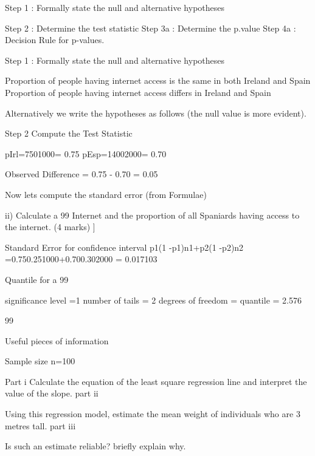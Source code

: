 \documentclass[12pt]{report}
\begin{document}
Step 1 : Formally state the null and alternative hypotheses

Step 2 : Determine the test statistic
Step 3a : Determine the p.value
Step 4a : Decision Rule for p-values.



Step 1 : Formally state the null and alternative hypotheses

Proportion of people having internet access is the same in both Ireland and Spain
Proportion of people having internet access differs in Ireland and Spain


Alternatively we write the hypotheses as follows (the null value is more evident).





Step 2 Compute the Test Statistic

pIrl=7501000= 0.75 
pEsp=14002000= 0.70

Observed Difference = 0.75 - 0.70 = 0.05  

Now lets compute the standard error (from Formulae)


ii)      Calculate a 99%
Internet and the proportion of all Spaniards having access to the internet.  (4 marks)
]

Standard Error for confidence interval	p1(1 -p1)n1+p2(1 -p2)n2	=0.750.251000+0.700.302000     =  0.017103



Quantile for a 99%

significance level  =1%
number of tails = 2
degrees of freedom = 
quantile = 2.576 


99%












Useful pieces of information


Sample size  n=100




Part i
Calculate the equation of the least square regression line and interpret the value of the slope.
part ii

Using this regression model, estimate the mean weight of individuals who are 3 metres tall.
part iii

Is such an estimate reliable?  briefly explain why.
\end{document}
